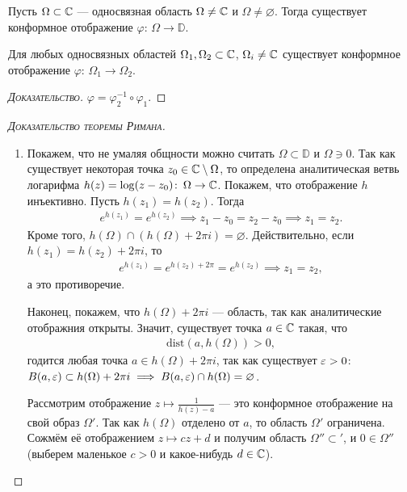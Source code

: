 \documentclass[../complex-analysis.tex]{subfiles}
\begin{document}
\begin{thm}
 Пусть $ \Omega \subset \mathbb{C} $ --- односвязная область  $ \Omega \neq \mathbb{C} $ и $ \Omega \neq \varnothing $. Тогда существует конформное отображение $ \varphi \colon\,\Omega\to\mathbb D $.
\end{thm}
\begin{crly}
 Для любых односвязных областей $ \Omega_1,\Omega_2 \subset \mathbb{C} $, $ \Omega_i \neq \mathbb{C} $ существует конформное отображение $ \varphi \colon\, \Omega_1 \to \Omega_2 $.
\end{crly}
\begin{proof}[\normalfont\textsc{Доказательство}]
 $ \varphi = \varphi_2^{-1} \circ \varphi_1 $.
\end{proof}
\begin{proof}[\normalfont\textsc{Доказательство теоремы Римана}]\
 \begin{enumerate}
  \item Покажем, что не умаляя общности можно считать $ \Omega \subset \mathbb D $ и $ \Omega \ni 0 $. Так как существует некоторая точка $ z_0 \in \mathbb{C} \setminus \Omega $, то определена аналитическая ветвь логарифма $ h(z) = \log (z - z_0) \colon\, \Omega \to \mathbb{C} $. Покажем, что отображение $ h $ инъективно. Пусть $ h(z_1) = h(z_2) $. Тогда
   \begin{align*}
    e^{h(z_1)} = e^{h(z_2)} \implies z_1 - z_0 = z_2 - z_0 \implies z_1 = z_2.
   \end{align*} Кроме того, $ h(\Omega) \cap (h(\Omega) + 2\pi i) = \varnothing $. Действительно, если $ h(z_1) = h(z_2) + 2\pi i $, то
   \begin{align*}
    e^{h(z_1)} = e^{h(z_2) + 2\pi} = e^{h(z_2)} \implies z_1 = z_2,
   \end{align*} а это противоречие.

   Наконец, покажем, что $ h(\Omega) + 2\pi i $ --- область, так как аналитические отображния открыты. Значит, существует точка $ a \in \mathbb{C} $ такая, что
   \begin{align*}
    \mathrm{dist}(a, h(\Omega)) > 0,
   \end{align*} годится любая точка $ a \in h(\Omega) + 2\pi i $, так как существует $ \varepsilon > 0 $: $ B(a,\varepsilon) \subset h(\Omega) + 2\pi i \implies B(a, \varepsilon) \cap h(\Omega) = \varnothing$.

   Рассмотрим отображение $ z \mapsto \frac{1}{h(z) - a} $ --- это конформное отображение на свой образ $ \Omega' $. Так как $ h(\Omega) $ отделено от $ a $, то область $ \Omega' $ ограничена. Сожмём её отображением $ z \mapsto cz + d $ и получим область $ \Omega'' \subset \mathbb ' $, и $ 0 \in \Omega'' $ (выберем маленькое $ c > 0 $ и какое-нибудь $ d \in \mathbb{C} $).


\end{enumerate}
\end{proof}
\end{document}
